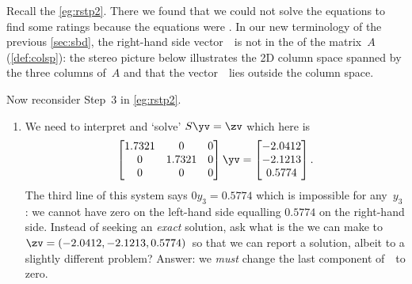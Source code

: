 \begin{example} \label{eg:rstp3}
Recall the   \cref{eg:rstp2}.
There we found that we could not solve the equations to find some ratings because the equations were .
In our new terminology of the previous \cref{sec:sbd}, the right-hand side vector~\bv\ is not in the  of the matrix~\(A\) (\cref{def:colsp}): 
the stereo picture below illustrates the 2D column space spanned by the three columns of~\(A\) and that the vector~\bv\ lies outside the column space.
\begin{center}
\end{center}
Now reconsider Step~3 in  \cref{eg:rstp2}.
\begin{enumerate} \addtocounter{enumi}2
\item We need to interpret and `solve' \(S\yv=\zv\) which here is
\begin{equation*}
\begin{bmatrix} 1.7321&0&0
\\0&1.7321&0
\\0&0&0 \end{bmatrix}\yv=\begin{bmatrix} 
   -2.0412\\-2.1213\\0.5774
\end{bmatrix}.
\end{equation*}
The third line of this system says \(0y_3=0.5774\) which is impossible for any~\(y_3\): we cannot have zero on the left-hand side equalling \(0.5774\) on the right-hand side.
Instead of seeking an \emph{exact} solution, ask what is the \emph{} we can make to~\(\zv=(-2.0412, -2.1213, 0.5774)\)\ so that we can report a solution, albeit to a slightly different problem?
Answer: we \emph{must} change the last component of~\zv\ to zero. 

\end{enumerate}
\end{example}
